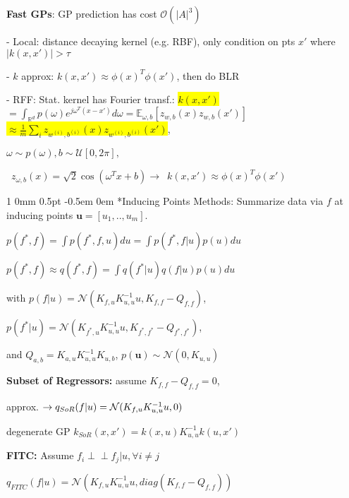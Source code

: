 \documentclass[11pt,landscape,a4paper,fleqn]{article}
\makeatletter
\newcommand*{\rsection}{%
	\@startsection{section}%
	{1}%
	{0mm}%
	{0.5pt}%
	{-0.5em \@plus 0em}
	{\color{myorange}\sffamily\small\bfseries}}
\newcommand{\mhl}[1]{\setlength{\fboxsep}{0pt}\colorbox{yellow}{#1}}
\newcommand{\indep}{\perp\!\!\!\perp}
\makeatother
\begin{document}
\begin{multicols*}{4}


		\textbf{Fast GPs}: GP prediction has cost $\mathcal{O}(|A|^3)$

		- Local: distance decaying kernel (e.g. RBF), only condition on pts $x'$ where $|k(x,x')| > \tau$

		- $k$ approx: $k(x,x') \approx \phi(x)^T \phi(x')$, then do BLR

		- RFF: Stat. kernel has Fourier transf.:  \mhl{$k(x,x')$}
	$= \int_{\mathbb{R}^d} p(\omega) e^{j \omega^T (x - x')} d\omega = \mathbb{E}_{\omega, b}[z_{w,b}(x) z_{w,b}(x')]$ \mhl{$\approx \frac{1}{m} \sum_i z_{w^{(i)},b^{(i)}}(x) z_{w^{(i)},b^{(i)}}(x')$},

	$\omega \sim p(\omega), b \sim \mathcal{U}[0, 2\pi],$

		\mbox{\fontsize{9}{6}\selectfont
			$z_{\omega, b}(x) = \sqrt{2} \cos(\omega^T x + b) \rightarrow$ $k(x,x') \approx \phi(x)^T \phi(x')$
		}

		\rsection*{Inducing Points Methods}: Summarize data via
	$f$ at inducing points $\mathbf{u} = [u_1,..,u_m]$.

	$p(f^*, f) = \int p(f^*, f, u) du = \int p(f^*, f | u) p(u) du$

	$p(f^*, f) \approx q(f^*, f) = \int q(f^* | u) q(f | u) p(u) du$

		with $p(f | u) = \mathcal{N}(K_{f,u} K_{u,u}^{-1} u, K_{f,f} - Q_{f,f} )$,

	$p(f^* | u) = \mathcal{N}(K_{f^*,u} K_{u,u}^{-1} u, K_{f^*, f^*} - Q_{f^*, f^*})$,

		and $Q_{a,b} = K_{a,u} K_{u,u}^{-1} K_{u,b}$, $p(\mathbf{u}) \sim \mathcal{N}(0, K_{u,u})$

		\textbf{Subset of Regressors:} assume $K_{f,f} - Q_{f,f} = 0$,

		approx. $\rightarrow q_{\tiny SoR}(f|u) = \mathcal{N}(K_{f,u} K_{u,u}^{-1} u,0)$

		degenerate GP $k_{SoR}(x,x') = k(x,u) K_{u,u}^{-1} k(u, x')$

		\textbf{FITC:} Assume $f_i \indep f_j | u, \forall i \neq j$

		\vspace*{-.5mm}
	$q_{FITC}(f | u) = \mathcal{N}(K_{f,u} K_{u,u}^{-1} u, diag(K_{f,f} - Q_{f,f}))$


\end{multicols*}
\end{document}
